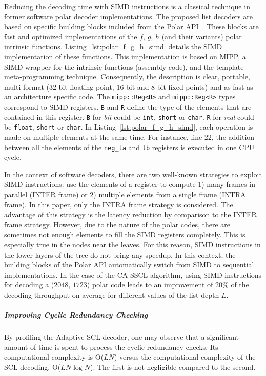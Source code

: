 Reducing the decoding time with SIMD instructions is a classical technique in
former software polar decoder implementations. The proposed list decoders are
based on specific building blocks included from the Polar
API~\cite{Cassagne2015c,Cassagne2016b}. These blocks are fast and optimized
implementations of the $f$, $g$, $h$ (and their variants) polar intrinsic
functions. Listing~\ref{lst:polar_f_g_h_simd} details the SIMD implementation of
these  functions. This implementation is based on MIPP, a SIMD wrapper for the
intrinsic functions (assembly code), and the template meta-programming
technique. Consequently, the description is clear, portable, multi-format
(32-bit floating-point, 16-bit and 8-bit fixed-points) and as fast as an
architecture specific code. The \texttt{mipp::Reg<B>} and \texttt{mipp::Reg<R>}
types correspond to SIMD registers. \texttt{B} and \texttt{R} define the type of
the elements that are contained in this register. \texttt{B} for \textit{bit}
could be \texttt{int}, \texttt{short} or \texttt{char}. \texttt{R} for
\textit{real} could be \texttt{float}, \texttt{short} or \texttt{char}. In
Listing~\ref{lst:polar_f_g_h_simd}, each operation is made on multiple elements
at the same  time. For instance, line 22, the addition between all the elements
of the \texttt{neg\_la} and \texttt{lb} registers is executed in one CPU cycle.

In the context of software decoders, there are two well-known strategies to
exploit SIMD instructions: use the elements of a register to compute 1) many
frames in parallel (INTER frame) or 2) multiple elements from a single frame
(INTRA frame). In this paper, only the INTRA frame strategy is considered. The
advantage of this strategy is the latency reduction by comparison to the INTER
frame strategy. However, due to the nature of the polar codes, there are
sometimes not enough elements to fill the SIMD registers completely. This is
especially true in the nodes near the leaves. For this reason, SIMD instructions
in the lower layers of the tree do not bring any speedup. In this context, the
building blocks of the Polar API automatically switch from SIMD to sequential
implementations. In the case of the CA-SSCL algorithm, using SIMD instructions
for decoding a ($2048$, $1723$) polar code leads to an improvement of $20\%$ of
the decoding throughput on average for different values of the list depth $L$.

\subparagraph{Improving Cyclic Redundancy Checking}
\label{sec:polar_crc}

By profiling the Adaptive SCL decoder, one may observe that a significant amount
of time is spent to process the cyclic redundancy checks. Its computational
complexity is O($LN$) versus the computational complexity of the SCL decoding,
O($LN\log N$). The first is not negligible compared to the second.

